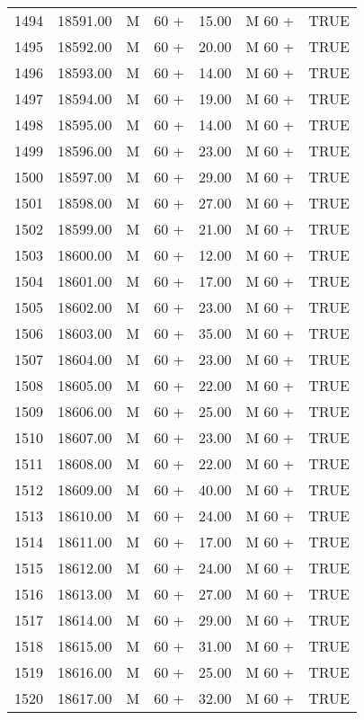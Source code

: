 \begin{table}[ht]
\begin{tabular}{rrllrll}
  1494 & 18591.00 & M & 60 + & 15.00 & M 60 + & TRUE \\ 
  1495 & 18592.00 & M & 60 + & 20.00 & M 60 + & TRUE \\ 
  1496 & 18593.00 & M & 60 + & 14.00 & M 60 + & TRUE \\ 
  1497 & 18594.00 & M & 60 + & 19.00 & M 60 + & TRUE \\ 
  1498 & 18595.00 & M & 60 + & 14.00 & M 60 + & TRUE \\ 
  1499 & 18596.00 & M & 60 + & 23.00 & M 60 + & TRUE \\ 
  1500 & 18597.00 & M & 60 + & 29.00 & M 60 + & TRUE \\ 
  1501 & 18598.00 & M & 60 + & 27.00 & M 60 + & TRUE \\ 
  1502 & 18599.00 & M & 60 + & 21.00 & M 60 + & TRUE \\ 
  1503 & 18600.00 & M & 60 + & 12.00 & M 60 + & TRUE \\ 
  1504 & 18601.00 & M & 60 + & 17.00 & M 60 + & TRUE \\ 
  1505 & 18602.00 & M & 60 + & 23.00 & M 60 + & TRUE \\ 
  1506 & 18603.00 & M & 60 + & 35.00 & M 60 + & TRUE \\ 
  1507 & 18604.00 & M & 60 + & 23.00 & M 60 + & TRUE \\ 
  1508 & 18605.00 & M & 60 + & 22.00 & M 60 + & TRUE \\ 
  1509 & 18606.00 & M & 60 + & 25.00 & M 60 + & TRUE \\ 
  1510 & 18607.00 & M & 60 + & 23.00 & M 60 + & TRUE \\ 
  1511 & 18608.00 & M & 60 + & 22.00 & M 60 + & TRUE \\ 
  1512 & 18609.00 & M & 60 + & 40.00 & M 60 + & TRUE \\ 
  1513 & 18610.00 & M & 60 + & 24.00 & M 60 + & TRUE \\ 
  1514 & 18611.00 & M & 60 + & 17.00 & M 60 + & TRUE \\ 
  1515 & 18612.00 & M & 60 + & 24.00 & M 60 + & TRUE \\ 
  1516 & 18613.00 & M & 60 + & 27.00 & M 60 + & TRUE \\ 
  1517 & 18614.00 & M & 60 + & 29.00 & M 60 + & TRUE \\ 
  1518 & 18615.00 & M & 60 + & 31.00 & M 60 + & TRUE \\ 
  1519 & 18616.00 & M & 60 + & 25.00 & M 60 + & TRUE \\ 
  1520 & 18617.00 & M & 60 + & 32.00 & M 60 + & TRUE \\ 

\end{tabular}
\end{table}
